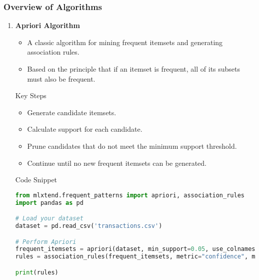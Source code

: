 \documentclass[aspectratio=169]{beamer}
\begin{document}
\begin{frame}[fragile]
    \frametitle{Overview of Algorithms}
    \begin{enumerate}
        \item \textbf{Apriori Algorithm}
        \begin{itemize}
            \item A classic algorithm for mining frequent itemsets and generating association rules.
            \item Based on the principle that if an itemset is frequent, all of its subsets must also be frequent.
        \end{itemize}

        \begin{block}{Key Steps}
            \begin{itemize}
                \item Generate candidate itemsets.
                \item Calculate support for each candidate.
                \item Prune candidates that do not meet the minimum support threshold.
                \item Continue until no new frequent itemsets can be generated.
            \end{itemize}
        \end{block}
        
        \begin{block}{Code Snippet}
            \begin{lstlisting}[language=Python]
from mlxtend.frequent_patterns import apriori, association_rules
import pandas as pd

# Load your dataset
dataset = pd.read_csv('transactions.csv')

# Perform Apriori
frequent_itemsets = apriori(dataset, min_support=0.05, use_colnames=True)
rules = association_rules(frequent_itemsets, metric="confidence", min_threshold=0.5)

print(rules)
            \end{lstlisting}
        \end{block}
    \end{enumerate}
\end{frame}
\end{document}
